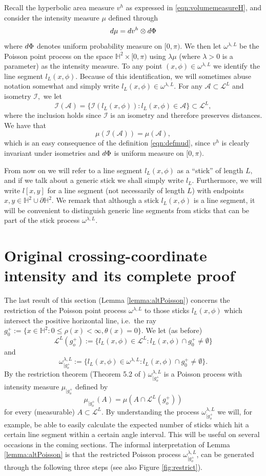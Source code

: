 \documentclass[10pt,a4paper]{amsart}
\newcommand{\BH}{{\mathbb{H}}}
\newcommand{\CA}{{\mathcal{A}}}
\newcommand{\CI}{{\mathcal{I}}}
\newcommand{\CL}{{\mathcal{L}}}
\newcommand{\dd}{{\rm d}}
\begin{document}
Recall the hyperbolic area measure $v^h$ as expressed in \eqref{eqn:volumemeasureH}, and consider the intensity measure $\mu$ defined through 
\begin{equation} \label{eqn:defmud}
    \dd \mu=\dd v^h \otimes \dd\Phi 
\end{equation}
where $\dd \Phi$ denotes uniform probability measure on $[0,\pi).$
We then let $\omega^{\lambda,L}$ be the Poisson point process on the space 
$\BH^2 \times [0,\pi)$ using $\lambda \mu$ 
(where $\lambda>0$ is a parameter) as the intensity 
measure. To any point $(x,\phi)\in \omega^{\lambda,L}$ we identify the line 
segment $l_L(x,\phi).$
Because of this identification, we will sometimes abuse notation somewhat and simply write
$l_L(x,\phi) \in \omega^{\lambda,L}.$ 
For any $\CA \subset \CL^L$ and isometry $\CI,$ we let 
\[
\CI(\CA)=\{\CI(l_L(x,\phi)): l_L(x,\phi)\in \CA\} \subset \CL^L,
\]
where the inclusion holds since $\CI$ is an isometry and therefore preserves distances. 
We have that 
\[
\mu(\CI(\CA))=\mu(\CA),    
\]
which is an easy consequence of the definition \eqref{eqn:defmud}, since $v^h$ is clearly 
invariant under isometries and $\dd \Phi$ is uniform measure on $[0,\pi).$




From now on we will refer to a line segment $l_L(x,\phi)$ as a ``stick'' of length $L,$
and if we talk about a generic stick we shall simply write $l_L.$  Furthermore, 
we will write $l[x,y]$ for a line segment (not necessarily of length $L$) 
with endpoints $x,y\in \BH^2 \cup \partial \BH^2.$ We remark that although a stick 
$l_L(x,\phi)$ is a line segment, it will be convenient to distinguish generic line segments
from sticks that can be part of the stick process $\omega^{\lambda,L}$.

\section{Original crossing-coordinate intensity and its complete proof}
The last result of this section (Lemma \ref{lemma:altPoisson}) 
concerns the restriction of the Poisson point process
$\omega^{\lambda,L}$ to those sticks $l_L(x,\phi)$ which intersect the positive horizontal line, 
i.e.\ the ray $g_0^+:=\{x\in \BH^2: 0\leq \rho(x)<\infty, \theta(x)=0\}.$ 
We let (as before)
\[
\CL^L(g_o^+):=\{l_L(x,\phi)\in \CL^L: l_L(x,\phi) \cap g_0^+ \neq \emptyset\}
\]
and 
\[
\omega^{\lambda,L}_{|g_o^+}:=\{l_L(x,\phi)\in \omega^{\lambda,L}: l_L(x,\phi) \cap g_0^+ \neq \emptyset\}.
\]
By the restriction theorem (Theorem 5.2 of \cite{LP_18}) $\omega^{\lambda,L}_{|g_o^+}$ is a Poisson 
process with intensity measure $\mu_{|g_o^+}$ defined by 
\[
\mu_{|g_o^+}(A)=\mu(A \cap \CL^L(g_o^+))
\]
for every (measurable) $A \subset \CL^L.$
By understanding the process $\omega^{\lambda,L}_{|g_o^+}$ we will, for example, be able to 
easily calculate the expected number of sticks which hit a certain 
line segment within a certain angle interval. This will be useful on several occasions in the coming 
sections.
The informal interpretation of Lemma \ref{lemma:altPoisson} is that the 
restricted Poisson process $\omega^{\lambda,L}_{|g_o^+}$, can be generated
through the following three steps (see also Figure \ref{fig:restrict}). 
\end{document}
